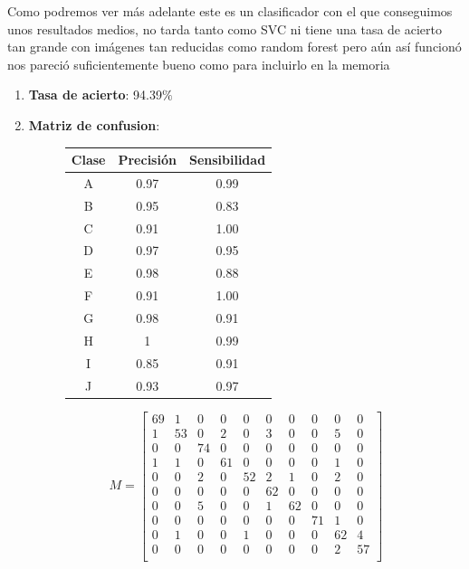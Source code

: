 \documentclass[8pt,a4paper]{article}
\begin{document}
Como podremos ver más adelante este es un clasificador con el que conseguimos unos resultados medios, no tarda tanto como SVC ni tiene una tasa de acierto tan grande con imágenes tan reducidas como random forest pero aún así funcionó nos pareció suficientemente bueno como para incluirlo en la memoria
\begin{enumerate}
\item \textbf{Tasa de acierto}: 94.39$\%$
\newpage
\item \textbf{Matriz de confusion}:
	

\begin{figure}[h!]
\centering
\begin{minipage}{.5\textwidth}
    \begin{tabular}{|c|c|c|} %
    \hline
      \textbf{Clase} & \textbf{Precisión} & \textbf{Sensibilidad}\\
      \hline
      A & 0.97 & 0.99\\
      \hline
      B & 0.95 & 0.83\\
      \hline
      C & 0.91 & 1.00\\
      \hline
      D & 0.97 & 0.95\\
      \hline
      E & 0.98 & 0.88\\
      \hline
      F & 0.91 & 1.00\\
      \hline
      G & 0.98 & 0.91\\
      \hline
      H & 1    & 0.99\\
      \hline
      I & 0.85 & 0.91\\
      \hline
      J & 0.93 & 0.97\\
      \hline
    \end{tabular}
\end{minipage}%
\begin{minipage}{.5\textwidth}
\[
M=
  \begin{bmatrix}
    69 & 1 & 0 & 0 & 0 & 0 & 0 & 0 & 0 & 0 \\
    1 & 53 & 0 & 2 & 0 & 3 & 0 & 0 & 5 & 0 \\
    0 & 0 & 74 & 0 & 0 & 0 & 0 & 0 & 0 & 0 \\
    1 & 1 & 0 & 61 & 0 & 0 & 0 & 0 & 1 & 0 \\
    0 & 0 & 2 & 0 & 52 & 2 & 1 & 0 & 2 & 0 \\
    0 & 0 & 0 & 0 & 0 & 62 & 0 & 0 & 0 & 0 \\
    0 & 0 & 5 & 0 & 0 & 1 & 62 & 0 & 0 & 0 \\
    0 & 0 & 0 & 0 & 0 & 0 & 0 & 71 & 1 & 0 \\
    0 & 1 & 0 & 0 & 1 & 0 & 0 & 0 & 62 & 4 \\
    0 & 0 & 0 & 0 & 0 & 0 & 0 & 0 & 2 & 57 \\
  \end{bmatrix}
\]
\end{minipage}
\end{figure}


\end{enumerate}
\end{document}
